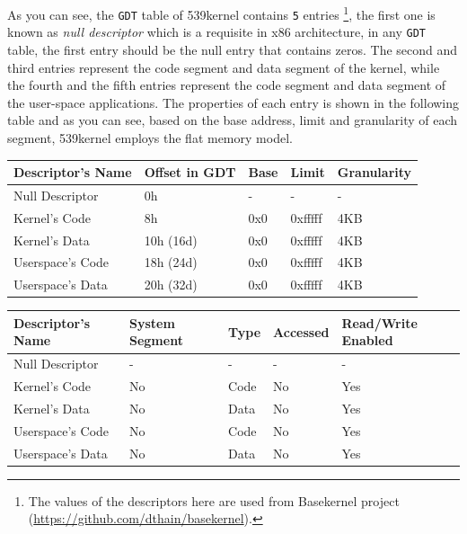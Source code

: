 As you can see, the \lstinline!GDT! table of 539kernel contains
\lstinline!5! entries \footnote{The values of the descriptors here are
  used from Basekernel project
  (\url{https://github.com/dthain/basekernel}).}, the first one is known
as \emph{null descriptor} which is a requisite in x86 architecture, in
any \lstinline!GDT! table, the first entry should be the null entry that
contains zeros. The second and third entries represent the code segment
and data segment of the kernel, while the fourth and the fifth entries
represent the code segment and data segment of the user-space
applications. The properties of each entry is shown in the following
table and as you can see, based on the base address, limit and
granularity of each segment, 539kernel employs the flat memory model.

\begin{longtable}[]{@{}lllll@{}}
\toprule
Descriptor's Name & Offset in GDT & Base & Limit &
Granularity\tabularnewline
\midrule
\endhead
Null Descriptor & 0h & - & - & -\tabularnewline
Kernel's Code & 8h & 0x0 & 0xfffff & 4KB\tabularnewline
Kernel's Data & 10h (16d) & 0x0 & 0xfffff & 4KB\tabularnewline
Userspace's Code & 18h (24d) & 0x0 & 0xfffff & 4KB\tabularnewline
Userspace's Data & 20h (32d) & 0x0 & 0xfffff & 4KB\tabularnewline
\bottomrule
\end{longtable}

\begin{longtable}[]{@{}lllll@{}}
\toprule
Descriptor's Name & System Segment & Type & Accessed & Read/Write
Enabled\tabularnewline
\midrule
\endhead
Null Descriptor & - & - & - & -\tabularnewline
Kernel's Code & No & Code & No & Yes\tabularnewline
Kernel's Data & No & Data & No & Yes\tabularnewline
Userspace's Code & No & Code & No & Yes\tabularnewline
Userspace's Data & No & Data & No & Yes\tabularnewline
\bottomrule
\end{longtable}

